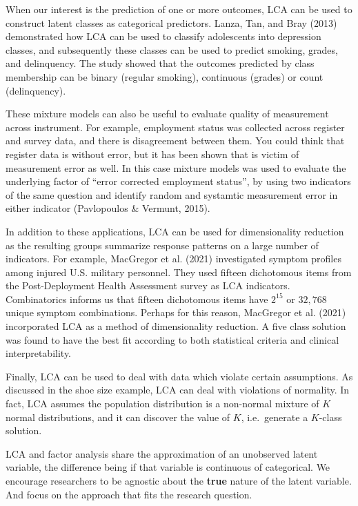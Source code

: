 \documentclass[
  ,man,floatsintext]{apa6}
\begin{document}
When our interest is the prediction of one or more outcomes, LCA can be
used to construct latent classes as categorical predictors.
Lanza, Tan, and Bray (2013) demonstrated how LCA can be used to classify
adolescents into depression classes, and subsequently these classes can
be used to predict smoking, grades, and delinquency. The study showed
that the outcomes predicted by class membership can be binary (regular
smoking), continuous (grades) or count (delinquency).

These mixture models can also be useful to evaluate quality of measurement across instrument. For example, employment status was collected across register and survey data, and there is disagreement between them. You could think that register data is without error, but it has been shown that is victim of measurement error as well. In this case mixture models was used to evaluate the underlying factor of ``error corrected employment status'', by using two indicators of the same question and identify random and systamtic measurement error in either indicator (Pavlopoulos \& Vermunt, 2015).

In addition to these applications, LCA can be used for dimensionality
reduction as the resulting groups summarize response patterns on a large
number of indicators. For example, MacGregor et al. (2021) investigated
symptom profiles among injured U.S. military personnel. They used
fifteen dichotomous items from the Post-Deployment Health Assessment
survey as LCA indicators. Combinatorics informs us that fifteen
dichotomous items have \(2^{15}\) or \(32,768\) unique symptom combinations.
Perhaps for this reason, MacGregor et al. (2021) incorporated LCA as a
method of dimensionality reduction. A five class solution was found to
have the best fit according to both statistical criteria and clinical
interpretability.

Finally, LCA can be used to deal with data which violate certain
assumptions. As discussed in the shoe size example, LCA can deal with
violations of normality. In fact, LCA assumes the population
distribution is a non-normal mixture of \(K\) normal distributions, and it
can discover the value of \(K\), i.e.~generate a \(K\)-class solution.

LCA and factor analysis share the approximation of an unobserved latent variable, the difference being if that variable is continuous of categorical. We encourage researchers to be agnostic about the \textbf{true} nature of the latent variable. And focus on the approach that fits the research question.
\end{document}
